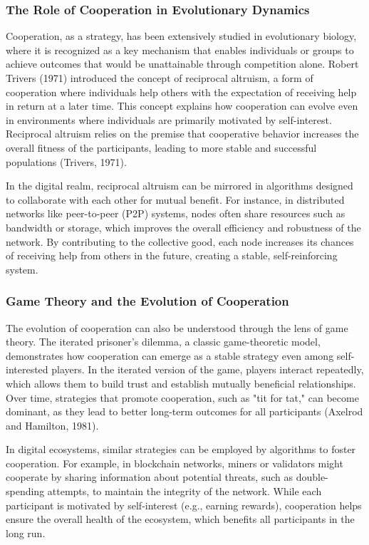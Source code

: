 \documentclass[12pt,twoside]{article}
\begin{document}
\subsubsection{The Role of Cooperation in Evolutionary Dynamics}

Cooperation, as a strategy, has been extensively studied in evolutionary biology, where it is recognized as a key mechanism that enables individuals or groups to achieve outcomes that would be unattainable through competition alone. Robert Trivers (1971) introduced the concept of reciprocal altruism, a form of cooperation where individuals help others with the expectation of receiving help in return at a later time. This concept explains how cooperation can evolve even in environments where individuals are primarily motivated by self-interest. Reciprocal altruism relies on the premise that cooperative behavior increases the overall fitness of the participants, leading to more stable and successful populations (Trivers, 1971).

In the digital realm, reciprocal altruism can be mirrored in algorithms designed to collaborate with each other for mutual benefit. For instance, in distributed networks like peer-to-peer (P2P) systems, nodes often share resources such as bandwidth or storage, which improves the overall efficiency and robustness of the network. By contributing to the collective good, each node increases its chances of receiving help from others in the future, creating a stable, self-reinforcing system.

\subsubsection{Game Theory and the Evolution of Cooperation}

The evolution of cooperation can also be understood through the lens of game theory. The iterated prisoner’s dilemma, a classic game-theoretic model, demonstrates how cooperation can emerge as a stable strategy even among self-interested players. In the iterated version of the game, players interact repeatedly, which allows them to build trust and establish mutually beneficial relationships. Over time, strategies that promote cooperation, such as "tit for tat," can become dominant, as they lead to better long-term outcomes for all participants (Axelrod and Hamilton, 1981).

In digital ecosystems, similar strategies can be employed by algorithms to foster cooperation. For example, in blockchain networks, miners or validators might cooperate by sharing information about potential threats, such as double-spending attempts, to maintain the integrity of the network. While each participant is motivated by self-interest (e.g., earning rewards), cooperation helps ensure the overall health of the ecosystem, which benefits all participants in the long run.
\end{document}
